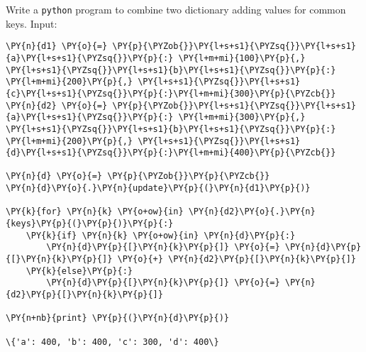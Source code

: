 \begin{Exercise}
Write a \texttt{python} program to combine two dictionary adding values for common keys.
Input:
\begin{Shaded}
\begin{Highlighting}[]
\OperatorTok{=}\NormalTok{ \{}\NormalTok{: }\NormalTok{, }\NormalTok{: }\NormalTok{, }\NormalTok{:}\NormalTok{\}}
\OperatorTok{=}\NormalTok{ \{}\NormalTok{: }\NormalTok{, }\NormalTok{: }\NormalTok{, }\NormalTok{:}\NormalTok{\}}
\end{Highlighting}
\end{Shaded}
\end{Exercise}

\begin{Answer}
\begin{codebox}[size=fbox, boxrule=1pt, colback=cellbackground, colframe=cellborder]
\begin{Verbatim}[commandchars=\\\{\}]
\PY{n}{d1} \PY{o}{=} \PY{p}{\PYZob{}}\PY{l+s+s1}{\PYZsq{}}\PY{l+s+s1}{a}\PY{l+s+s1}{\PYZsq{}}\PY{p}{:} \PY{l+m+mi}{100}\PY{p}{,} \PY{l+s+s1}{\PYZsq{}}\PY{l+s+s1}{b}\PY{l+s+s1}{\PYZsq{}}\PY{p}{:} \PY{l+m+mi}{200}\PY{p}{,} \PY{l+s+s1}{\PYZsq{}}\PY{l+s+s1}{c}\PY{l+s+s1}{\PYZsq{}}\PY{p}{:}\PY{l+m+mi}{300}\PY{p}{\PYZcb{}}
\PY{n}{d2} \PY{o}{=} \PY{p}{\PYZob{}}\PY{l+s+s1}{\PYZsq{}}\PY{l+s+s1}{a}\PY{l+s+s1}{\PYZsq{}}\PY{p}{:} \PY{l+m+mi}{300}\PY{p}{,} \PY{l+s+s1}{\PYZsq{}}\PY{l+s+s1}{b}\PY{l+s+s1}{\PYZsq{}}\PY{p}{:} \PY{l+m+mi}{200}\PY{p}{,} \PY{l+s+s1}{\PYZsq{}}\PY{l+s+s1}{d}\PY{l+s+s1}{\PYZsq{}}\PY{p}{:}\PY{l+m+mi}{400}\PY{p}{\PYZcb{}}

\PY{n}{d} \PY{o}{=} \PY{p}{\PYZob{}}\PY{p}{\PYZcb{}}
\PY{n}{d}\PY{o}{.}\PY{n}{update}\PY{p}{(}\PY{n}{d1}\PY{p}{)}

\PY{k}{for} \PY{n}{k} \PY{o+ow}{in} \PY{n}{d2}\PY{o}{.}\PY{n}{keys}\PY{p}{(}\PY{p}{)}\PY{p}{:}
    \PY{k}{if} \PY{n}{k} \PY{o+ow}{in} \PY{n}{d}\PY{p}{:}
        \PY{n}{d}\PY{p}{[}\PY{n}{k}\PY{p}{]} \PY{o}{=} \PY{n}{d}\PY{p}{[}\PY{n}{k}\PY{p}{]} \PY{o}{+} \PY{n}{d2}\PY{p}{[}\PY{n}{k}\PY{p}{]}
    \PY{k}{else}\PY{p}{:}
        \PY{n}{d}\PY{p}{[}\PY{n}{k}\PY{p}{]} \PY{o}{=} \PY{n}{d2}\PY{p}{[}\PY{n}{k}\PY{p}{]}

\PY{n+nb}{print} \PY{p}{(}\PY{n}{d}\PY{p}{)}

\{'a': 400, 'b': 400, 'c': 300, 'd': 400\}
\end{Verbatim}
\end{codebox}
\end{Answer}

